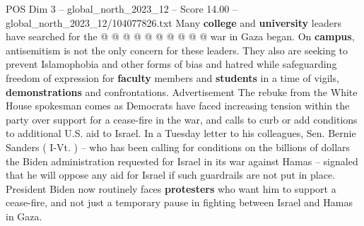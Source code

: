 \begin{textsample}{POS Dim 3 – global\_north\_2023\_12 – Score 14.00 – global\_north\_2023\_12/104077826.txt}
Many \textbf{college} and \textbf{university} leaders have searched for the @ @ @ @ @ @ @ @ @ @ war in Gaza began.
On \textbf{campus}, antisemitism is not the only concern for these leaders.
They also are seeking to prevent Islamophobia and other forms of bias and hatred while safeguarding freedom of expression for \textbf{faculty} members and \textbf{students} in a time of vigils, \textbf{demonstrations} and confrontations.
Advertisement The rebuke from the White House spokesman comes as Democrats have faced increasing tension within the party over support for a cease-fire in the war, and calls to curb or add conditions to additional U.S. aid to Israel.
In a Tuesday letter to his colleagues, Sen.
Bernie Sanders ( I-Vt. ) -- who has been calling for conditions on the billions of dollars the Biden administration requested for Israel in its war against Hamas -- signaled that he will oppose any aid for Israel if such guardrails are not put in place.
President Biden now routinely faces \textbf{protesters} who want him to support a cease-fire, and not just a temporary pause in fighting between Israel and Hamas in Gaza.

\end{textsample}
